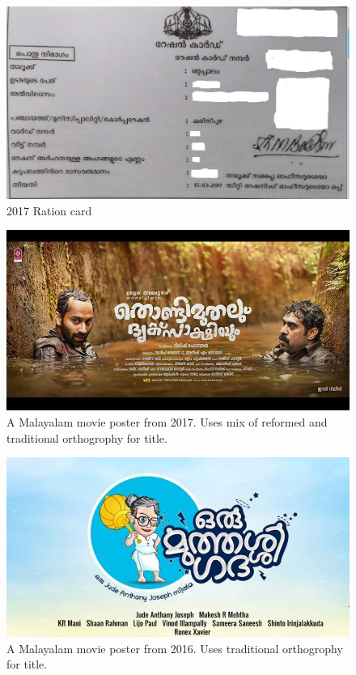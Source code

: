 \documentclass[10pt]{article}
\begin{document}
\begin{figure}[H]
 \centering
  \includegraphics[width=1.0\textwidth]{images/2017-rationcard.jpg}
   \caption{2017 Ration card}
  \label{rationcard}
\end{figure}


\begin{figure}[H]
 \centering
  \includegraphics[width=1.0\textwidth]{images/2017-movieposter-Thondimuthal}
 \caption{A Malayalam movie poster from 2017. Uses mix of reformed and traditional orthogrophy for title.}
\end{figure}

\begin{figure}[H]
 \centering
  \includegraphics[width=1.0\textwidth]{images/2016-oru-muthashi-gadha}
 \caption{A Malayalam movie poster from 2016. Uses traditional orthogrophy for title.}
\end{figure}
\end{document}
